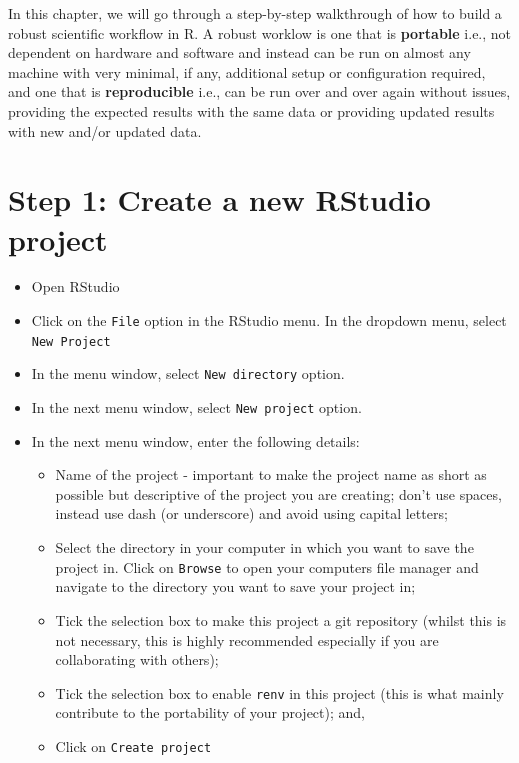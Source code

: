 \documentclass[
  12pt,
]{book}
\begin{document}
In this chapter, we will go through a step-by-step walkthrough of how to build a robust scientific workflow in R. A robust worklow is one that is \textbf{portable} i.e., not dependent on hardware and software and instead can be run on almost any machine with very minimal, if any, additional setup or configuration required, and one that is \textbf{reproducible} i.e., can be run over and over again without issues, providing the expected results with the same data or providing updated results with new and/or updated data.

\hypertarget{step-1-create-a-new-rstudio-project}{%
\section{Step 1: Create a new RStudio project}\label{step-1-create-a-new-rstudio-project}}

\begin{itemize}
\item
  Open RStudio
\item
  Click on the \texttt{File} option in the RStudio menu. In the dropdown menu, select \texttt{New\ Project}
\item
  In the menu window, select \texttt{New\ directory} option.
\item
  In the next menu window, select \texttt{New\ project} option.
\item
  In the next menu window, enter the following details:

  \begin{itemize}
  \item
    Name of the project - important to make the project name as short as possible but descriptive of the project you are creating; don't use spaces, instead use dash (or underscore) and avoid using capital letters;
  \item
    Select the directory in your computer in which you want to save the project in. Click on \texttt{Browse} to open your computers file manager and navigate to the directory you want to save your project in;
  \item
    Tick the selection box to make this project a git repository (whilst this is not necessary, this is highly recommended especially if you are collaborating with others);
  \item
    Tick the selection box to enable \texttt{renv} in this project (this is what mainly contribute to the portability of your project); and,
  \item
    Click on \texttt{Create\ project}
  \end{itemize}
\end{itemize}
\end{document}
